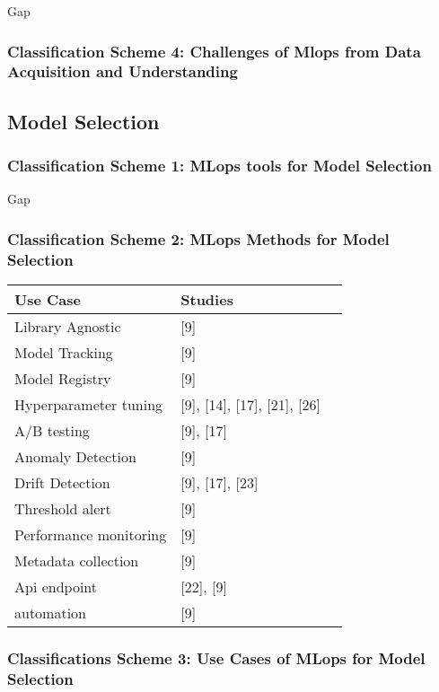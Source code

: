 Gap

\subsubsection{Classification Scheme 4: Challenges of Mlops from Data Acquisition and Understanding}

\subsection{Model Selection}

\subsubsection{Classification Scheme 1: MLops tools for Model Selection}

Gap

\subsubsection{Classification Scheme 2: MLops Methods  for Model Selection}

\begin{tabular}{|p{6cm}|p{6cm}|p{3cm}|}
  \hline
  Use Case & Studies\\
  \hline
  Library Agnostic & [9]\\
  \hline
  Model Tracking & [9]\\
  \hline
  Model Registry & [9]\\
  \hline
  Hyperparameter tuning & [9], [14], [17], [21], [26]\\
  \hline
  A/B testing & [9], [17]\\
  \hline
  Anomaly Detection & [9]\\
  \hline
  Drift Detection & [9], [17], [23]\\
  \hline
  Threshold alert & [9]\\
  \hline
  Performance monitoring & [9]\\
  \hline
  Metadata collection & [9]\\
  \hline
  Api endpoint & [22], [9]\\
  \hline
  automation & [9]\\
  \hline
\end{tabular}

\subsubsection{Classifications Scheme 3: Use Cases of MLops for Model Selection}


